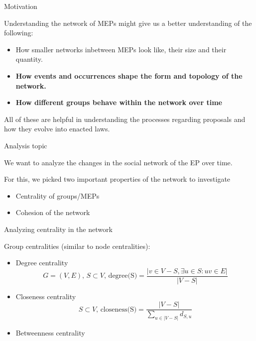 \documentclass{beamer}
\begin{document}
\begin{frame}{Motivation}

Understanding the network of MEPs might give us a better understanding of the following:

\bigskip

\begin{itemize}
	\pause \item How smaller networks inbetween MEPs look like, their size and their quantity.
	
	\pause \item \textbf{How events and occurrences shape the form and topology of the network.}
		
	\pause \item \textbf{How different groups behave within the network over time}

\end{itemize}

\pause All of these are helpful in understanding the processes regarding proposals and how they evolve into enacted laws.

\end{frame}

\begin{frame}{Analysis topic}
	
	We want to analyze the changes in the social network of the EP over time.
	
	\vspace{2mm}
	
	\pause For this, we picked two important properties of the network to investigate\begin{itemize}
		\pause \item Centrality of groups/MEPs
		
		\pause \item Cohesion of the network
	\end{itemize}
	
\end{frame}

\begin{frame}{Analyzing centrality in the network}
	
	Group centralities (similar to node centralities):
\begin{itemize}
	\pause \item Degree centrality 
	\[ 
		G = (V,E)\text{, } S \subset V \text{,  }\text{degree(S)} = \frac{|v \in V-S, \exists u \in S: uv \in E|}{|V-S|}	
	\]
	
	\pause \item Closeness centrality 
	\[
		S \subset V \text{,  }\text{closeness(S)} = \frac{|V-S|}{\sum_{u \in |V-S|}d_{S,u} }
	\]
		
	\pause \item Betweenness centrality

\end{itemize}
\end{frame}
\end{document}
